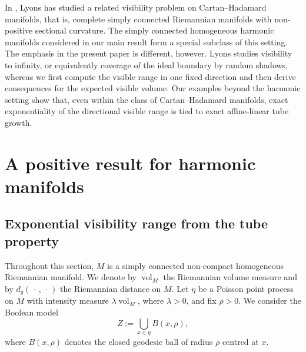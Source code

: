 \documentclass[11pt,a4paper]{article}
\theoremstyle{plain}
\theoremstyle{definition}
\theoremstyle{remark}
\newcommand{\vol}{\mathop{\mathrm{vol}}\nolimits}
\begin{document}
In \cite{LyonsRandomShadows}, Lyons has studied a related visibility problem on Cartan--Hadamard manifolds, that is, complete simply connected Riemannian manifolds with non-positive sectional curvature. The simply connected homogeneous harmonic manifolds considered in our main result form a special
subclass of this setting. The emphasis in the present paper is different, however. Lyons studies visibility to infinity, or equivalently coverage of the ideal boundary by random shadows, whereas we first compute the visible range in one fixed direction and then derive consequences for the expected visible volume. Our examples beyond the harmonic setting show that, even within the class of Cartan--Hadamard manifolds, exact exponentiality of the directional visible range is tied to exact affine-linear tube growth.



\section{A positive result for harmonic manifolds}

\subsection{Exponential visibility range from the tube property}

Throughout this section, \(M\) is a simply connected non-compact homogeneous
Riemannian manifold. We denote by \(\vol_M\) the Riemannian volume measure and by $d_g(\,\cdot\,,\,\cdot\,)$ the Riemannian distance on
\(M\). Let \(\eta\) be a Poisson point process on \(M\) with intensity measure
\(\lambda\vol_M\), where \(\lambda>0\), and fix \(\rho>0\). We consider the
Boolean model
\[
Z:=\bigcup_{x\in\eta} B(x,\rho),
\]
where \(B(x,\rho)\) denotes the closed geodesic ball of radius \(\rho\) centred
at \(x\).
\end{document}
